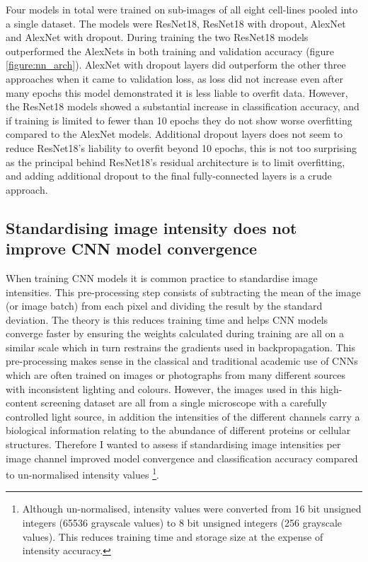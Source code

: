 \documentclass[a4paper,11pt,twoside,openright]{scrbook}
\begin{document}
Four models in total were trained on sub-images of all eight cell-lines pooled into a single dataset.
The models were ResNet18, ResNet18 with dropout, AlexNet and AlexNet with dropout.
During training the two ResNet18 models outperformed the AlexNets in both training and validation accuracy (figure 
\ref{figure:nn_arch}).
AlexNet with dropout layers did outperform the other three approaches when it came to validation loss, as loss did not 
increase even after many epochs this model demonstrated it is less liable to overfit data.
However, the ResNet18 models showed a substantial increase in classification accuracy, and if training is limited to 
fewer than 10 epochs they do not show worse overfitting compared to the AlexNet models.
Additional dropout layers does not seem to reduce ResNet18's liability to overfit beyond 10 epochs, this is not too 
surprising as the principal behind ResNet18's residual architecture is to limit overfitting, and adding additional 
dropout to the final fully-connected layers is a crude approach.


\subsection{Standardising image intensity does not improve CNN model convergence}

When training CNN models it is common practice to standardise image intensities.
This pre-processing step consists of subtracting the mean of the image (or image batch) from each pixel and dividing 
the result by the standard deviation.
The theory is this reduces training time and helps CNN models converge faster by ensuring the weights calculated during 
training are all on a similar scale which in turn restrains the gradients used in backpropagation.
This pre-processing makes sense in the classical and traditional academic use of CNNs which are often trained on images 
or photographs from many different sources with inconsistent lighting and colours.
However, the images used in this high-content screening dataset are all from a single microscope with a carefully 
controlled light source, in addition the intensities of the different channels carry a biological information relating 
to the abundance of different proteins or cellular structures.
Therefore I wanted to assess if standardising image intensities per image channel improved model convergence and 
classification accuracy compared to un-normalised intensity values
\footnote{Although un-normalised, intensity values were converted from 16 bit unsigned integers (65536 grayscale 
values) to 8 bit unsigned integers (256 grayscale values).
This reduces training time and storage size at the expense of intensity accuracy.}.
\end{document}
